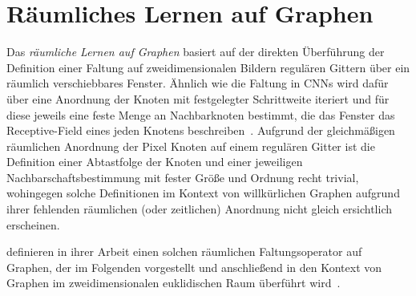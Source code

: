 \chapter{Räumliches Lernen auf Graphen}
\label{raeumliches_lernen}

Das \emph{räumliche Lernen auf Graphen} basiert auf der direkten Überführung der Definition einer Faltung auf zweidimensionalen Bildern \bzw{} regulären Gittern über ein räumlich verschiebbares Fenster.
Ähnlich wie die Faltung in \glspl{CNN} wird dafür über eine Anordnung der Knoten mit festgelegter Schrittweite iteriert und für diese jeweils eine feste Menge an Nachbarknoten bestimmt, die das Fenster \bzw{} das Receptive-Field eines jeden Knotens beschreiben~\cite{patchy}.
Aufgrund der gleichmäßigen räumlichen Anordnung der Pixel \bzw{} Knoten auf einem regulären Gitter ist die Definition einer Abtastfolge der Knoten und einer jeweiligen Nachbarschaftsbestimmung mit fester Größe und Ordnung recht trivial, wohingegen solche Definitionen im Kontext von willkürlichen Graphen aufgrund ihrer \ggf{} fehlenden räumlichen (oder zeitlichen) Anordnung nicht gleich ersichtlich erscheinen.

\citeauthor{patchy} definieren in ihrer Arbeit einen solchen räumlichen Faltungsoperator auf Graphen, der im Folgenden vorgestellt und anschließend in den Kontext von Graphen im zweidimensionalen euklidischen Raum überführt wird~\cite{patchy}.





